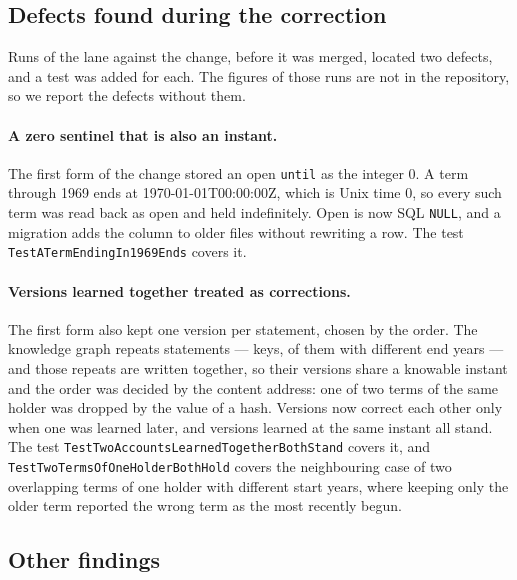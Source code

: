 \subsection{Defects found during the correction}
\label{sec:eval-defects}

Runs of the lane against the change, before it was merged, located two
defects, and a test was added for each. The figures of those runs are not in the
repository, so we report the defects without them.

\paragraph{A zero sentinel that is also an instant.}
The first form of the change stored an open \texttt{until} as the integer 0. A
term through 1969 ends at 1970-01-01T00:00:00Z, which is Unix time 0, so every
such term was read back as open and held indefinitely. Open is now SQL
\texttt{NULL}, and a migration adds the column to older files without rewriting
a row. The test \texttt{TestATermEndingIn1969Ends} covers it.

\paragraph{Versions learned together treated as corrections.}
The first form also kept one version per statement, chosen by the order. The
knowledge graph repeats statements ---  keys, 
of them with different end years --- and those repeats are written together, so
their versions share a knowable instant and the order was decided by the
content address: one of two terms of the same holder was dropped by the value of
a hash. Versions now correct each other only when one was learned later, and
versions learned at the same instant all stand. The test
\texttt{TestTwoAccountsLearnedTogetherBothStand} covers it, and
\texttt{TestTwoTermsOfOneHolderBothHold} covers the neighbouring case of two
overlapping terms of one holder with different start years, where keeping only
the older term reported the wrong term as the most recently begun.

\subsection{Other findings}
\label{sec:eval-found}

